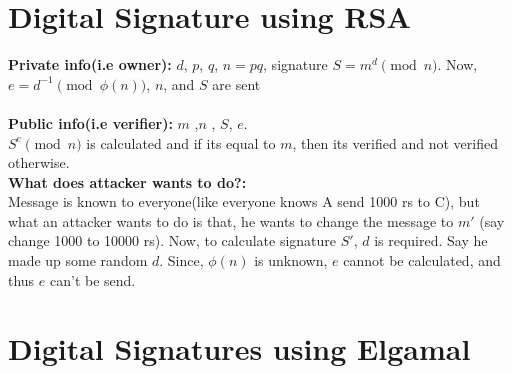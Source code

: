 \documentclass[english, 11pt]{article}
\begin{document}
\section*{Digital Signature using RSA}
\textbf{Private info(i.e owner):} $d$, $p$, $q$, $n = pq$, signature $S = m^d \pmod{n}$. Now, $e = d^{-1} \pmod{\phi(n)}$, $n$, and $S$ are sent \\ \\
\textbf{Public info(i.e verifier):} $m$ ,$n$ , $S$, $e$. \\ $S^{e} \pmod{n}$ is calculated and if its equal to $m$, then its verified and not verified otherwise. \\

\textbf{What does attacker wants to do?:} \\
Message is known to everyone(like everyone knows A send 1000 rs to C), but what an attacker wants to do is that, he wants to change the message to $m'$ (say change 1000 to 10000 rs). Now, to calculate signature $S'$, $d$ is required. Say he made up some random $d$.
Since, $\phi(n)$ is unknown, $e$ cannot be calculated, and thus $e$ can't be send.

\section*{Digital Signatures using Elgamal}
\end{document}
